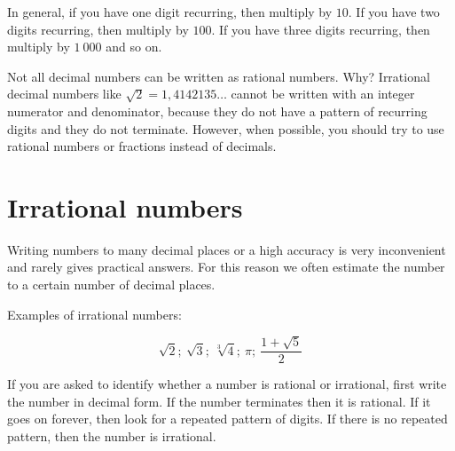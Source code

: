 In general, if you have one digit recurring, then multiply by $10$. If
you have two digits recurring, then multiply by $100$. If you have
three digits recurring, then multiply by $1~000$ and so on.\par

Not all decimal numbers can be written as rational numbers. Why? Irrational decimal numbers like 
$\sqrt{2}=1,4142135\ldots$
cannot be written with an integer numerator and denominator, because they do not have a pattern of recurring digits and they do not terminate. However, when possible, you should try to use rational numbers or fractions instead of decimals.




\section{Irrational numbers}
\setcounter{figure}{1}
\setcounter{subfigure}{1}


Writing numbers to many decimal places or a high accuracy is very inconvenient and rarely gives practical answers. For this reason we often estimate the number to a certain number of decimal places.\par 


Examples of irrational numbers:\par 

\begin{equation*}
\sqrt{2};~\sqrt{3};~\sqrt[3]{4};~\pi ;
~\frac{1+\sqrt{5}}{2}
\end{equation*}


If you are asked to identify whether a number is rational or
irrational, first write the number in decimal form. If the number
terminates then it is rational. If it goes on forever, then look for a
repeated pattern of digits. If there is no repeated pattern, then the
number is irrational.

